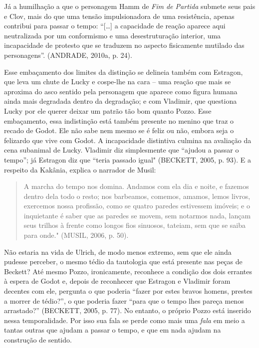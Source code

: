Já a humilhação a que o personagem Hamm de \emph{Fim de Partida} submete
seus pais e Clov, mais do que uma tensão impulsionadora de uma
resistência, apenas contribui para passar o tempo: ``{[}\ldots{}{]} a
capacidade de reação aparece aqui neutralizada por um conformismo e uma
desestruturação interior, uma incapacidade de protesto que se traduzem
no aspecto fisicamente mutilado das personagens''. (ANDRADE, 2010a, p.
24).

Esse embaçamento dos limites da distinção se delineia também com
Estragon, que leva um chute de Lucky e cospe-lhe na cara -- uma reação
que mais se aproxima do asco sentido pela personagem que aparece como
figura humana ainda mais degradada dentro da degradação; e com Vladimir,
que questiona Lucky por ele querer deixar um patrão tão bom quanto
Pozzo. Esse embaçamento, essa indistinção está também presente no menino
que traz o recado de Godot. Ele não sabe nem mesmo se é feliz ou não,
embora seja o felizardo que vive com Godot. A incapacidade distintiva
culmina na avaliação da cena subanimal de Lucky. Vladimir diz
simplesmente que ``ajudou a passar o tempo''; já Estragon diz que
``teria passado igual" (BECKETT, 2005, p. 93). E a respeito da Kakânia,
explica o narrador de Musil:

\begin{quote}
A marcha do tempo nos domina. Andamos com ela dia e noite, e fazemos
dentro dela todo o resto; nos barbeamos, comemos, amamos, lemos livros,
exercemos nossa profissão, como se quatro paredes estivessem imóveis; e
o inquietante é saber que as paredes se movem, sem notarmos nada, lançam
seus trilhos à frente como longos fios sinuosos, tateiam, sem que se
saiba para onde." (MUSIL, 2006, p. 50).
\end{quote}

Não estaria na vida de Ulrich, de modo menos extremo, sem que ele ainda
pudesse perceber, o mesmo tédio da tautologia que está presente nas
peças de Beckett? Até mesmo Pozzo, ironicamente, reconhece a condição
dos dois errantes à espera de Godot e, depois de reconhecer que Estragon
e Vladimir foram decentes com ele, pergunta o que poderia ``fazer por
estes bravos homens, prestes a morrer de tédio?'', o que poderia fazer
``para que o tempo lhes pareça menos arrastado?'' (BECKETT, 2005, p.
77). No entanto, o próprio Pozzo está inserido nessa temporalidade. Por
isso sua fala se perde como mais uma \emph{fala} em meio a tantas outras
que ajudam a passar o tempo, e que em nada ajudam na construção de
sentido.

